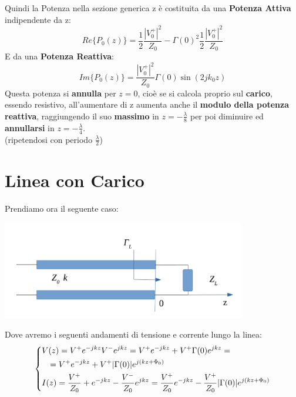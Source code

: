 Quindi la Potenza nella sezione generica z è costituita da una \textbf{Potenza Attiva} indipendente da z:
\begin{equation*}
    \tag{Potenza Attiva}
    Re\{P_0(z)\} = \frac{1}{2} \frac{|V_0^+|^2}{Z_0} - {\Gamma(0)}^2 \frac{1}{2} \frac{|V_0^+|^2}{Z_0}
\end{equation*}
E da una \textbf{Potenza Reattiva}:
\begin{equation*}
    \tag{Potenza Reattiva}
    Im\{P_0(z)\} = \frac{|V_0^+|^2}{Z_0} \Gamma(0) \sin(2jk_0z)
\end{equation*}
Questa potenza si \textbf{annulla} per $z=0$, cioè se si calcola proprio sul \textbf{carico}, essendo resistivo, all'aumentare di z aumenta anche il \textbf{modulo della potenza reattiva}, raggiungendo il suo \textbf{massimo} in $z = - \frac{\lambda}{8}$ per poi diminuire ed \textbf{annullarsi} in $z= - \frac{\lambda}{4}$.\\
(ripetendosi con periodo $\frac{\lambda}{2}$)
\newpage
\section{Linea con Carico}
Prendiamo ora il seguente caso:
\begin{center}
    \includegraphics[width=0.8\textwidth]{Images/figure15.png}
\end{center}
Dove avremo i seguenti andamenti di tensione e corrente lungo la linea:
\begin{equation*}
    \begin{dcases}
    V(z) = V^+ e^{-jkz}  V^- e^{jkz} = V^+ e^{-jkz} + V^+ \Gamma(0) e^{jkz} = \\
    \quad= V^+ e^{-jkz} + V^+ |\Gamma(0)| e^{j(kz + \Phi_0)}\\
    I(z) = \frac{V^+}{Z_0} + e^{-jkz} - \frac{V^-}{Z_0} e^{jkz} = \frac{V^+}{Z_0} e^{-jkz} - \frac{V^+}{Z_0} |\Gamma(0)| e^{j(kz + \Phi_0)} 
    \end{dcases}
\end{equation*}


